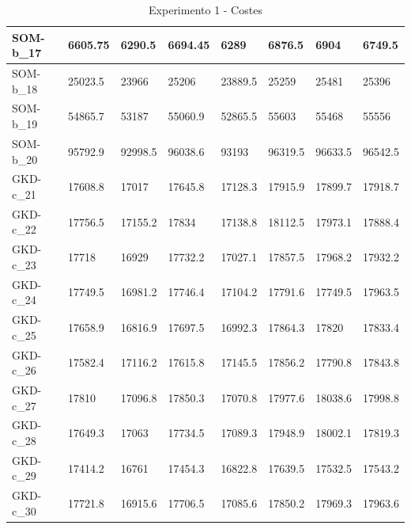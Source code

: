 \documentclass[11pt,a4paper]{article}
\begin{document}
\begin{table}[H]
\begin{tabular}{l|l|l|l|l|l|l|l|}
			\multicolumn{1}{|l|}{SOM-b\_17} & 6605.75 & 6290.5  & 6694.45 & 6289    & 6876.5  & 6904    & 6749.5  \\ \hline
			\multicolumn{1}{|l|}{SOM-b\_18} & 25023.5 & 23966   & 25206   & 23889.5 & 25259   & 25481   & 25396   \\ \hline
			\multicolumn{1}{|l|}{SOM-b\_19} & 54865.7 & 53187   & 55060.9 & 52865.5 & 55603   & 55468   & 55556   \\ \hline
			\multicolumn{1}{|l|}{SOM-b\_20} & 95792.9 & 92998.5 & 96038.6 & 93193   & 96319.5 & 96633.5 & 96542.5 \\ \hline
			\multicolumn{1}{|l|}{GKD-c\_21} & 17608.8 & 17017   & 17645.8 & 17128.3 & 17915.9 & 17899.7 & 17918.7 \\ \hline
			\multicolumn{1}{|l|}{GKD-c\_22} & 17756.5 & 17155.2 & 17834   & 17138.8 & 18112.5 & 17973.1 & 17888.4 \\ \hline
			\multicolumn{1}{|l|}{GKD-c\_23} & 17718   & 16929   & 17732.2 & 17027.1 & 17857.5 & 17968.2 & 17932.2 \\ \hline
			\multicolumn{1}{|l|}{GKD-c\_24} & 17749.5 & 16981.2 & 17746.4 & 17104.2 & 17791.6 & 17749.5 & 17963.5 \\ \hline
			\multicolumn{1}{|l|}{GKD-c\_25} & 17658.9 & 16816.9 & 17697.5 & 16992.3 & 17864.3 & 17820   & 17833.4 \\ \hline
			\multicolumn{1}{|l|}{GKD-c\_26} & 17582.4 & 17116.2 & 17615.8 & 17145.5 & 17856.2 & 17790.8 & 17843.8 \\ \hline
			\multicolumn{1}{|l|}{GKD-c\_27} & 17810   & 17096.8 & 17850.3 & 17070.8 & 17977.6 & 18038.6 & 17998.8 \\ \hline
			\multicolumn{1}{|l|}{GKD-c\_28} & 17649.3 & 17063   & 17734.5 & 17089.3 & 17948.9 & 18002.1 & 17819.3 \\ \hline
			\multicolumn{1}{|l|}{GKD-c\_29} & 17414.2 & 16761   & 17454.3 & 16822.8 & 17639.5 & 17532.5 & 17543.2 \\ \hline
			\multicolumn{1}{|l|}{GKD-c\_30} & 17721.8 & 16915.6 & 17706.5 & 17085.6 & 17850.2 & 17969.3 & 17963.6 \\ \hline
		\end{tabular}
		\caption{ Experimento 1 - Costes }
		\label{211}
	\end{table}
\end{document}
